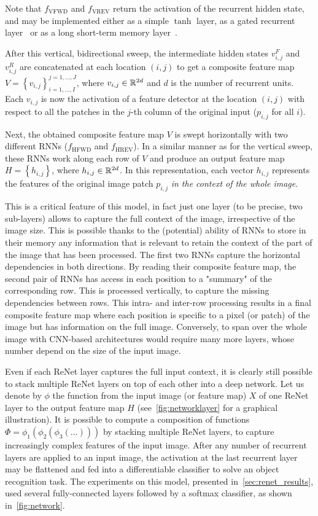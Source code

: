 Note that $f_{\text{VFWD}}$ and $f_{\text{VREV}}$ return the activation of the
recurrent hidden state, and may be implemented either as a simple $\tanh$ layer,
as a gated recurrent layer~\citep{Cho2014} or as a long short-term memory
layer~\citep{Hochreiter+Schmidhuber-1997}.

After this vertical, bidirectional sweep, the intermediate hidden states
$v^F_{i,j}$ and $v^R_{i,j}$ are concatenated at each location $(i,j)$ to get a
composite feature map $V= \left\{ v_{i,j} \right\}_{i=1,\ldots,I}^{
j=1,\ldots,J}$, where $v_{i,j} \in \mathbb{R}^{2d}$ and $d$ is the number of recurrent
units.  Each $v_{i,j}$ is now the activation of a feature detector at the
location $(i,j)$ with respect to all the patches in the $j$-th column of the
original input ($p_{i, j}$ for all $i$).

Next, the obtained composite feature map $V$ is swept horizontally with two
different RNNs ($f_{\text{HFWD}}$ and $f_{\text{HREV}}$). In a similar manner
as for the vertical sweep, these RNNs work along each row of $V$ and produce an
output feature map $H = \left\{ h_{i,j} \right\}$, where $h_{i,j} \in
\mathbb{R}^{2d}$. In this representation, each vector $h_{i,j}$ represents the
features of the original image patch $p_{i,j}$ \emph{in the context of the
whole image}.

This is a critical feature of this model, in fact just one layer (to be
precise, two sub-layers) allows to capture the full context of the image,
irrespective of the image size. This is possible thanks to the (potential)
ability of RNNs to store in their memory any information that is relevant to
retain the context of the part of the image that has been processed. The first
two RNNs capture the horizontal dependencies in both directions. By reading
their composite feature map, the second pair of RNNs has access in each
position to a "summary" of the corresponding row. This is processed vertically,
to capture the missing dependencies between rows. This intra- and inter-row
processing results in a final composite feature map where each position is
specific to a pixel (or patch) of the image but has information on the full
image. Conversely, to span over the whole image with CNN-based architectures
would require many more layers, whose number depend on the size of the input
image.

Even if each ReNet layer captures the full input context, it is clearly still
possible to stack multiple ReNet layers on top of each other into a deep
network. Let us denote by $\phi$ the function from the input image (or feature
map) $X$ of one ReNet layer to the output feature map $H$
(see~\autoref{fig:networklayer} for a graphical illustration). It is possible
to compute a composition of functions $\Phi = \phi_1(\phi_2(\phi_3(\dots)))$ by
stacking multiple ReNet layers, to capture increasingly complex features of the
input image.  After any number of recurrent layers are applied to an input
image, the activation at the last recurrent layer may be flattened and fed into
a differentiable classifier to solve an object recognition task. The
experiments on this model, presented in~\autoref{sec:renet_results}, used
several fully-connected layers followed by a softmax classifier, as shown
in~\autoref{fig:network}.

